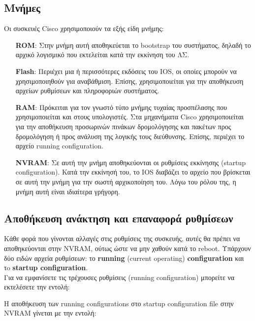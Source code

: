 \documentclass[12pt]{article}
\begin{document}
\subsection{Μνήμες}
Οι συσκευές Cisco χρησιμοποιούν τα εξής είδη μνήμης:
\begin{itemize}
	\item[\textbf{ROM}:] Στην μνήμη αυτή αποθηκεύεται το bootstrap του συστήματος, δηλαδή το αρχικό λογισμικό που εκτελείται κατά την εκκίνηση του ΛΣ.
	\item[\textbf{Flash}:] Περιέχει μια ή περισσότερες εκδόσεις του IOS, οι οποίες μπορούν να χρησιμοποιηθούν για αναβάθμιση. Επίσης, χρησιμοποιείται για την αποθήκευση αρχείων ρυθμίσεων και πληροφοριών συστήματος.
	\item[\textbf{RAM}:] Πρόκειται για τον γνωστό τύπο μνήμης τυχαίας προσπέλασης που χρησιμοποιείται και στους υπολογιστές. Στα μηχανήματα Cisco χρησιμοποιείται για την αποθήκευση προσωρινών πινάκων δρομολόγησης και πακέτων προς δρομολόγηση ή προς ανάλυση της λογικής τους διεύθυνσης. Επίσης, περιέχει το αρχείο running configuration.
	\item[\textbf{NVRAM}:] Σε αυτή την μνήμη αποθηκεύονται οι ρυθμίσεις εκκίνησης (startup configuration). Κατά την εκκίνησή του, το IOS διαβάζει το αρχείο που βρίσκεται σε αυτή την μνήμη για την σωστή αρχικοποίηση του. Λόγω του ρόλου της, η μνήμη αυτή είναι ιδιαίτερα γρήγορη.
\end{itemize}

\subsection{Αποθήκευση ανάκτηση και επαναφορά ρυθμίσεων}
Κάθε φορά που γίνονται αλλαγές στις ρυθμίσεις της συσκευής, αυτές θα πρέπει να αποθηκεύονται στην NVRAM, ούτως ώστε να μην χαθούν κατά το reboot. Υπάρχουν δύο ειδών αρχεία ρυθμίσεων: το \textbf{running} (current operating) \textbf{configuration} και τo \textbf{startup configuration}.\\\newline
Για να εμφανίσετε τις τρέχουσες ρυθμίσεις (running configuration) μπορείτε να εκτελέσετε την εντολή:

\begin{flushleft}
\end{flushleft}

Η αποθήκευση των running configurations στο startup configuration file στην NVRAM γίνεται με την εντολή:

\begin{flushleft}
\end{flushleft}
\end{document}
